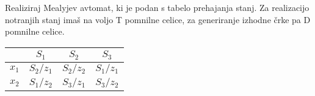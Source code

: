 \bigskip

\begin{zgled}

Realiziraj Mealyjev avtomat, ki je podan s tabelo prehajanja stanj. Za realizacijo notranjih stanj imaš na voljo T pomnilne celice, za generiranje izhodne črke pa D pomnilne celice. 

\begin{center}
\begin{tabular}{c|ccc}
 & $S_1$ & $S_2$ & $S_3$\\
\hline
$x_1$ & $S_2 / z_1$ & $S_2 / z_2$ & $S_1 / z_1$\\
$x_2$ & $S_1 / z_2$ & $S_3 / z_1$ & $S_3/ z_2$ \\
\end{tabular}
\end{center}

\end{zgled}

